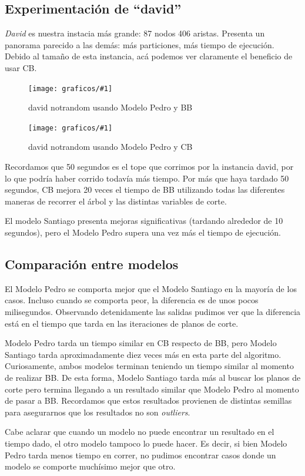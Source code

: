 \documentclass[a4paper, 10pt, twoside]{article}
\newcommand{\diagramavfig}[2]{%
  \begin{figure}[H]
    \texttt{[image: graficos/\#1]}%
    \caption{#2}
    \label{fig:#1}
  \end{figure}
}
\begin{document}
\subsection{Experimentación de ``david''}

\textit{David} es nuestra instacia más grande: 87 nodos 406 aristas. Presenta un panorama parecido a las demás: más particiones, más tiempo de ejecución. Debido al tamaño de esta instancia, acá podemos ver claramente el beneficio de usar CB.

\diagramavfig{david_notrandom_1_bb_0_segunJuntada}{david notrandom usando Modelo Pedro y BB}
\diagramavfig{david_notrandom_1_cb_0_segunJuntada}{david notrandom usando Modelo Pedro y CB}

Recordamos que 50 segundos es el tope que corrimos por la instancia david, por lo que podría haber corrido todavía más tiempo. Por más que haya tardado 50 segundos, CB mejora 20 veces el tiempo de BB utilizando todas las diferentes maneras de recorrer el árbol y las distintas variables de corte.

El modelo Santiago presenta mejoras significativas (tardando alrededor de 10 segundos), pero el Modelo Pedro supera una vez más el tiempo de ejecución.

\subsection{Comparación entre modelos}

El Modelo Pedro se comporta mejor que el Modelo Santiago en la mayoría de los casos. Incluso cuando se comporta peor, la diferencia es de unos pocos milisegundos. Observando detenidamente las salidas pudimos ver que la diferencia está en el tiempo que tarda en las iteraciones de planos de corte.

Modelo Pedro tarda un tiempo similar en CB respecto de BB, pero Modelo Santiago tarda aproximadamente diez veces más en esta parte del algoritmo. Curiosamente, ambos modelos terminan teniendo un tiempo similar al momento de realizar BB. De esta forma, Modelo Santiago tarda más al buscar los planos de corte pero termina llegando a un resultado similar que Modelo Pedro al momento de pasar a BB. Recordamos que estos resultados provienen de distintas semillas para asegurarnos que los resultados no son \textit{outliers}.

Cabe aclarar que cuando un modelo no puede encontrar un resultado en el tiempo dado, el otro modelo tampoco lo puede hacer. Es decir, si bien Modelo Pedro tarda menos tiempo en correr, no pudimos encontrar casos donde un modelo se comporte muchísimo mejor que otro.
\end{document}
